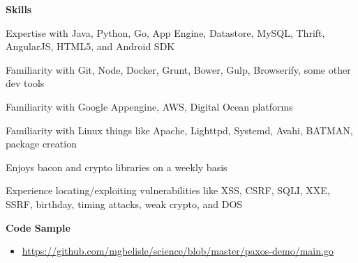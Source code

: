 \documentclass[10pt, a4paper]{article}
\begin{document}
\textbf{Skills}
\begin{itemize*}
  \item Expertise with Java, Python, Go, App Engine, Datastore, MySQL, Thrift, AngularJS, HTML5, and Android SDK
  \item Familiarity with Git, Node, Docker, Grunt, Bower, Gulp, Browserify, some other dev tools
  \item Familiarity with Google Appengine, AWS, Digital Ocean platforms
  \item Familiarity with Linux things like Apache, Lighttpd, Systemd, Avahi, BATMAN, package creation
  \item Enjoys bacon and crypto libraries on a weekly basis
  \item Experience locating/exploiting vulnerabilities like XSS, CSRF, SQLI, XXE, SSRF, birthday, timing attacks, weak crypto, and DOS
\end{itemize*}
\textbf{Code Sample}
\begin{itemize}
  \item[] \url{https://github.com/mgbelisle/science/blob/master/paxos-demo/main.go}
\end{itemize}
\end{document}

